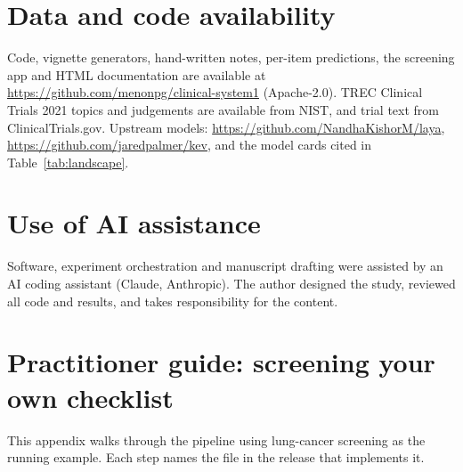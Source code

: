 \documentclass[11pt]{article}
\begin{document}
\section*{Data and code availability}
Code, vignette generators, hand-written notes, per-item predictions, the screening app and HTML documentation are available at \url{https://github.com/menonpg/clinical-system1} (Apache-2.0).
TREC Clinical Trials 2021 topics and judgements are available from NIST, and trial text from ClinicalTrials.gov.
Upstream models: \url{https://github.com/NandhaKishorM/laya}, \url{https://github.com/jaredpalmer/kev}, and the model cards cited in Table~\ref{tab:landscape}.

\section*{Use of AI assistance}
Software, experiment orchestration and manuscript drafting were assisted by an AI coding assistant (Claude, Anthropic). The author designed the study, reviewed all code and results, and takes responsibility for the content.



\appendix
\section{Practitioner guide: screening your own checklist}
\label{app:guide}
This appendix walks through the pipeline using lung-cancer screening as the running example. Each step names the file in the release that implements it.
\end{document}
